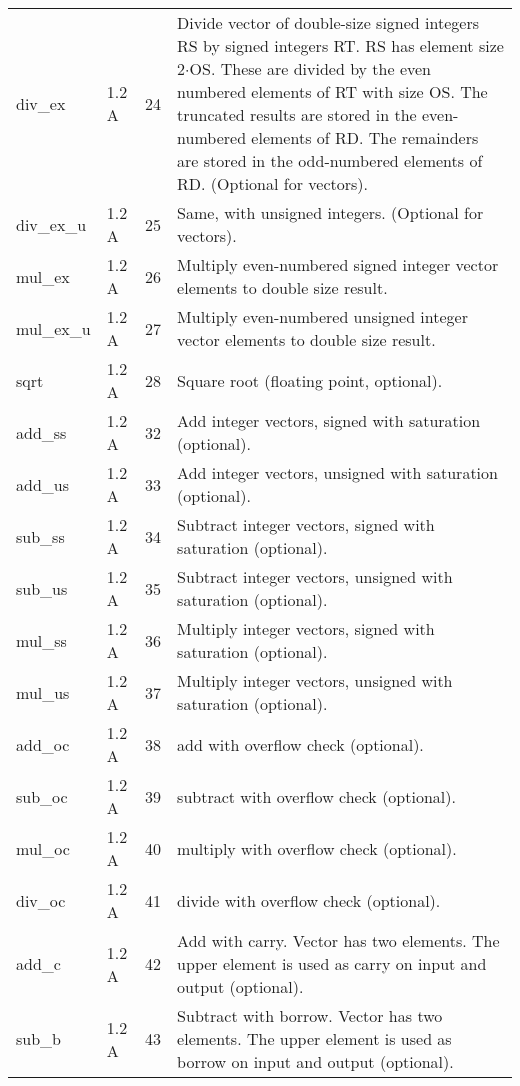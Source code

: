 \documentclass[forwardcom.tex]{subfiles}
\begin{document}
\begin{longtable} {|p{25mm}|p{14mm}|p{10mm}|p{95mm}|}
div\_ex    & 1.2 A & 24 & Divide vector of double-size signed integers RS by signed integers RT. RS has element size 2$\cdot$OS. These are divided by the even numbered
elements of RT with size OS. The truncated results are stored in
the even-numbered elements of RD. The remainders are stored in
the odd-numbered elements of RD. (Optional for vectors). \\
div\_ex\_u    & 1.2 A & 25 & Same, with unsigned integers. (Optional for vectors). \\
mul\_ex       & 1.2 A & 26 & Multiply even-numbered signed integer vector elements to double size result. \\
mul\_ex\_u    & 1.2 A & 27 & Multiply even-numbered unsigned integer vector elements to double size result. \\
sqrt          & 1.2 A & 28 & Square root (floating point, optional). \\

add\_ss       & 1.2 A & 32 & Add integer vectors, signed with saturation (optional). \\
add\_us       & 1.2 A & 33 & Add integer vectors, unsigned with saturation (optional). \\
sub\_ss       & 1.2 A & 34 & Subtract integer vectors, signed with saturation (optional). \\
sub\_us       & 1.2 A & 35 & Subtract integer vectors, unsigned with saturation (optional). \\
mul\_ss       & 1.2 A & 36 & Multiply integer vectors, signed with saturation (optional). \\
mul\_us       & 1.2 A & 37 & Multiply integer vectors, unsigned with saturation (optional). \\
add\_oc       & 1.2 A & 38 & add with overflow check (optional). \\
sub\_oc       & 1.2 A & 39 & subtract with overflow check (optional). \\
mul\_oc       & 1.2 A & 40 & multiply with overflow check (optional). \\
div\_oc       & 1.2 A & 41 & divide with overflow check (optional). \\
add\_c        & 1.2 A & 42 & Add with carry. Vector has two elements. The upper element is used as carry on input and output (optional). \\
sub\_b        & 1.2 A & 43 & Subtract with borrow. Vector has two elements. The upper element is used as borrow on input and output (optional). \\


\end{longtable}
\end{document}
